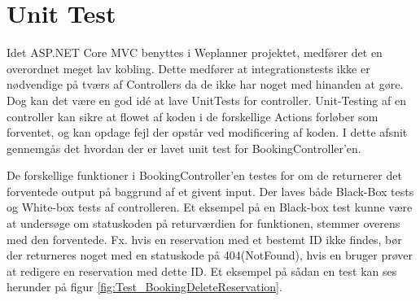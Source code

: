 

\section{Unit Test}
Idet ASP.NET Core MVC benyttes i Weplanner projektet, medfører det en overordnet meget lav kobling. Dette medfører at integrationstests ikke er nødvendige på tværs af Controllers da de ikke har noget med hinanden at gøre. Dog kan det være en god idé at lave UnitTests for controller. Unit-Testing af en controller kan sikre at flowet af koden i de forskellige Actions forløber som forventet, og kan opdage fejl der opstår ved modificering af koden. I dette afsnit gennemgås det hvordan der er lavet unit test for BookingController'en. 

De forskellige funktioner i BookingController'en testes for om de returnerer det forventede output på baggrund af et givent input. Der laves både Black-Box tests og White-box tests af controlleren. Et eksempel på en Black-box test kunne være at undersøge om statuskoden på returværdien for funktionen, stemmer overens med den forventede. Fx. hvis en reservation med et bestemt ID ikke findes, bør der returneres noget med en statuskode på 404(NotFound), hvis en bruger prøver at redigere en reservation med dette ID. Et eksempel på sådan en test kan ses herunder på figur \ref{fig:Test_BookingDeleteReservation}.   

